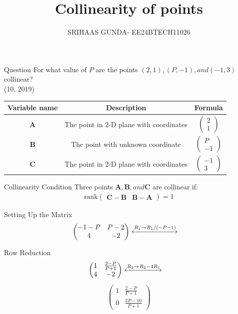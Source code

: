 \documentclass{beamer}
\title{Collinearity of points}
\author{SRIHAAS GUNDA- EE24BTECH11026}
\date{}
\theoremstyle{remark}
\newcommand{\myvec}[1]{\ensuremath{\begin{pmatrix}#1\end{pmatrix}}}
\let\vec\mathbf
\numberwithin{equation}{section}
\begin{document}
\frame{\titlepage} 

\begin{frame}{Question}
     For what value of $P$  are the points $(2,1),(P,-1),and(-1,3)$ collinear? \\
    \hfill (10, 2019)
\end{frame}

\begin{frame}
\begin{center}
	\begin{tabular}{|c|c|c|}
    \hline
    \textbf{Variable name} & \textbf{Description} & \textbf{Formula}\\ 
    \hline
	    $\vec{A}$  & The point in 2-D plane with coordinates & $\myvec{2\\ 1}$ \\
    \hline 
	    $\vec{B}$  & The point with unknown coordinate  & $\myvec{P \\ -1}$ \\
    \hline
            $\vec{C}$  & The point in 2-D plane with coordinates & $\myvec{-1\\3}$ \\
    \hline   
    \end{tabular}
\end{center}
\end{frame}

\begin{frame}{Collinearity Condition}
    Three points $\vec{A} ,\vec{B}, and \vec{C} $ are collinear if:
    \begin{align*}
    \text{rank}\begin{pmatrix} \vec{C}-\vec{B} & \vec{B}-\vec{A} \end{pmatrix} = 1
    \end{align*}
\end{frame}

\begin{frame}{Setting Up the Matrix}
    \begin{align}
\myvec{ -1-P & P-2 \\
         4 & -2 } 
\xleftrightarrow[]{R_1 \rightarrow {R_1/(-P-1)}}\quad
\end{align}
\end{frame}


\begin{frame}{Row Reduction}
 \begin{align}
 \myvec{ 1 & \frac{2-P}{P+1} \\
         4 & -2 } 
\xleftrightarrow[]{R_2 \rightarrow {R_2-4R_1}}\quad
 \end{align}
 \begin{align}
 \myvec{ 1 & \frac{2-P}{P+1} \\
          0 & \frac{2P-10}{P+1} } 
\end{align}
\end{frame}
\end{document}
